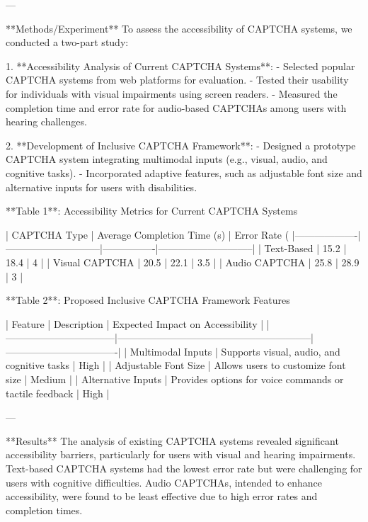 ---

**Methods/Experiment**  
To assess the accessibility of CAPTCHA systems, we conducted a two-part study:  

1. **Accessibility Analysis of Current CAPTCHA Systems**:  
   - Selected popular CAPTCHA systems from web platforms for evaluation.  
   - Tested their usability for individuals with visual impairments using screen readers.  
   - Measured the completion time and error rate for audio-based CAPTCHAs among users with hearing challenges.  

2. **Development of Inclusive CAPTCHA Framework**:  
   - Designed a prototype CAPTCHA system integrating multimodal inputs (e.g., visual, audio, and cognitive tasks).  
   - Incorporated adaptive features, such as adjustable font size and alternative inputs for users with disabilities.  

**Table 1**: Accessibility Metrics for Current CAPTCHA Systems  

| CAPTCHA Type      | Average Completion Time (s) | Error Rate (%
|-------------------|-----------------------------|----------------|-----------------------------|  
| Text-Based        | 15.2                        | 18.4           | 4                           |  
| Visual CAPTCHA    | 20.5                        | 22.1           | 3.5                         |  
| Audio CAPTCHA     | 25.8                        | 28.9           | 3                           |  

**Table 2**: Proposed Inclusive CAPTCHA Framework Features  

| Feature                         | Description                                               | Expected Impact on Accessibility |  
|---------------------------------|-----------------------------------------------------------|----------------------------------|  
| Multimodal Inputs               | Supports visual, audio, and cognitive tasks              | High                              |  
| Adjustable Font Size            | Allows users to customize font size                      | Medium                            |  
| Alternative Inputs              | Provides options for voice commands or tactile feedback | High                              |  

---

**Results**  
The analysis of existing CAPTCHA systems revealed significant accessibility barriers, particularly for users with visual and hearing impairments. Text-based CAPTCHA systems had the lowest error rate but were challenging for users with cognitive difficulties. Audio CAPTCHAs, intended to enhance accessibility, were found to be least effective due to high error rates and completion times.  


